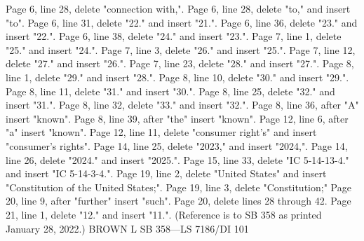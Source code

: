 Page 6, line 28, delete "connection with,".
Page 6, line 28, delete "to," and insert "to".
Page 6, line 31, delete "22." and insert "21.".
Page 6, line 36, delete "23." and insert "22.".
Page 6, line 38, delete "24." and insert "23.".
Page 7, line 1, delete "25." and insert "24.".
Page 7, line 3, delete "26." and insert "25.".
Page 7, line 12, delete "27." and insert "26.".
Page 7, line 23, delete "28." and insert "27.".
Page 8, line 1, delete "29." and insert "28.".
Page 8, line 10, delete "30." and insert "29.".
Page 8, line 11, delete "31." and insert "30.".
Page 8, line 25, delete "32." and insert "31.".
Page 8, line 32, delete "33." and insert "32.".
Page 8, line 36, after "A" insert "known".
Page 8, line 39, after "the" insert "known".
Page 12, line 6, after "a" insert "known".
Page 12, line 11, delete "consumer right's" and insert "consumer's
rights".
Page 14, line 25, delete "2023," and insert "2024,".
Page 14, line 26, delete "2024." and insert "2025.".
Page 15, line 33, delete "IC 5-14-13-4." and insert "IC 5-14-3-4.".
Page 19, line 2, delete "United States" and insert "Constitution of
the United States;".
Page 19, line 3, delete "Constitution;"
Page 20, line 9, after "further" insert "such".
Page 20, delete lines 28 through 42.
Page 21, line 1, delete "12." and insert "11.".
(Reference is to SB 358 as printed January 28, 2022.)
BROWN L
SB 358—LS 7186/DI 101